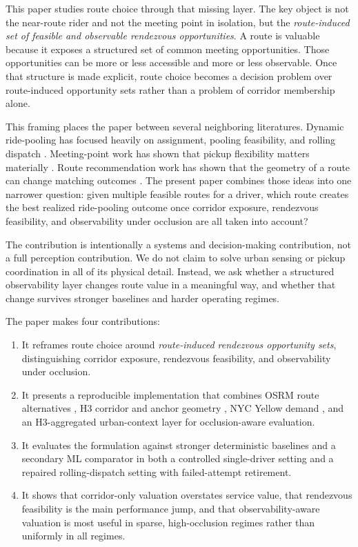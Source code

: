 \documentclass[journal]{IEEEtran}
\begin{document}
This paper studies route choice through that missing layer. The key object is not the near-route rider and not the meeting point in isolation, but the \emph{route-induced set of feasible and observable rendezvous opportunities}. A route is valuable because it exposes a structured set of common meeting opportunities. Those opportunities can be more or less accessible and more or less observable. Once that structure is made explicit, route choice becomes a decision problem over route-induced opportunity sets rather than a problem of corridor membership alone.

This framing places the paper between several neighboring literatures. Dynamic ride-pooling has focused heavily on assignment, pooling feasibility, and rolling dispatch \cite{agatz2012,alonso2017}. Meeting-point work has shown that pickup flexibility matters materially \cite{stiglic2016,stumpe2024,zhou2026}. Route recommendation work has shown that the geometry of a route can change matching outcomes \cite{bassem2022,xia2019}. The present paper combines those ideas into one narrower question: given multiple feasible routes for a driver, which route creates the best realized ride-pooling outcome once corridor exposure, rendezvous feasibility, and observability under occlusion are all taken into account?

The contribution is intentionally a systems and decision-making contribution, not a full perception contribution. We do not claim to solve urban sensing or pickup coordination in all of its physical detail. Instead, we ask whether a structured observability layer changes route value in a meaningful way, and whether that change survives stronger baselines and harder operating regimes.

The paper makes four contributions:
\begin{enumerate}
\item It reframes route choice around \emph{route-induced rendezvous opportunity sets}, distinguishing corridor exposure, rendezvous feasibility, and observability under occlusion.
\item It presents a reproducible implementation that combines OSRM route alternatives \cite{osrmapi}, H3 corridor and anchor geometry \cite{h3docs}, NYC Yellow demand \cite{azureyellow}, and an H3-aggregated urban-context layer for occlusion-aware evaluation.
\item It evaluates the formulation against stronger deterministic baselines and a secondary ML comparator in both a controlled single-driver setting and a repaired rolling-dispatch setting with failed-attempt retirement.
\item It shows that corridor-only valuation overstates service value, that rendezvous feasibility is the main performance jump, and that observability-aware valuation is most useful in sparse, high-occlusion regimes rather than uniformly in all regimes.
\end{enumerate}
\end{document}
